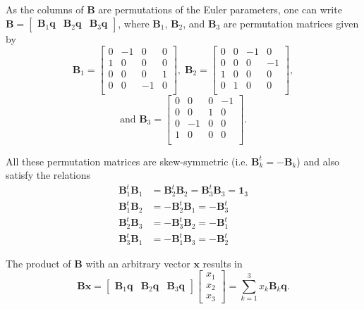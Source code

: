 \documentclass[aip,jcp,reprint,amsmath,amssymb,raggedbottom]{revtex4-1}
\newcommand{\mt}[1]{\boldsymbol{\mathbf{#1}}}           %
\newcommand{\vt}[1]{\boldsymbol{\mathbf{#1}}}           %
\newcommand{\tr}[1]{#1^t}                               %
\begin{document}
As the columns of $\mt B$ are permutations of the Euler parameters, one can write $\mt B = [\begin{array}{ccc}{\mt B}_1{\vt q} & {\mt B}_2{\vt q} & {\mt B}_3{\vt q}\end{array}]$, where $\mt B_1$, $\mt B_2$, and $\mt B_3$ are permutation matrices given by
\[
{\mt B}_1 = \left[ \begin{array}{rrrr}
 0 & -1 &  0 &  0 \\
 1 &  0 &  0 &  0 \\
 0 &  0 &  0 &  1 \\
 0 &  0 & -1 &  0 \\
\end{array} \right], \;
{\mt B}_2 = \left[ \begin{array}{rrrr}
 0 &  0 & -1 &  0 \\
 0 &  0 &  0 & -1 \\
 1 &  0 &  0 &  0 \\
 0 &  1 &  0 &  0 \\
\end{array} \right],
\]\[
\text{and }{\mt B}_3 = \left[ \begin{array}{rrrr}
 0 &  0 &  0 & -1 \\
 0 &  0 &  1 &  0 \\
 0 & -1 &  0 &  0 \\
 1 &  0 &  0 &  0 \\
\end{array} \right].
\]

All these permutation matrices are skew-symmetric (i.e. $\tr{\mt B_k} = -\mt B_k$) and also satisfy the relations\cite{Dichmann1999}
\begin{equation}
\label{eq:BB_products}
\begin{aligned}
\tr{\mt B_1}{\mt B_1} &= \tr{\mt B_2}{\mt B_2} = \tr{\mt B_3}{\mt B_3} = \mt 1_3 \\
\tr{\mt B_1}{\mt B_2} &= -\tr{\mt B_2}{\mt B_1} = -\tr{\mt B_3} \\
\tr{\mt B_2}{\mt B_3} &= -\tr{\mt B_3}{\mt B_2} = -\tr{\mt B_1} \\
\tr{\mt B_3}{\mt B_1} &= -\tr{\mt B_1}{\mt B_3} = -\tr{\mt B_2}
\end{aligned}
\end{equation}

The product of $\mt B$ with an arbitrary vector $\vt x$ results in
\begin{equation}
\label{eq:product_B_vector}
\mt B \vt x = \left[ \begin{array}{ccc} \mt B_1 \vt q & \mt B_2 \vt q & \mt B_3 \vt q \end{array}\right] \left[ \begin{array}{c} x_1 \\ x_2 \\ x_3 \end{array} \right] = \sum_{k=1}^3 x_k {\mt B}_k \vt q.
\end{equation}
\end{document}
